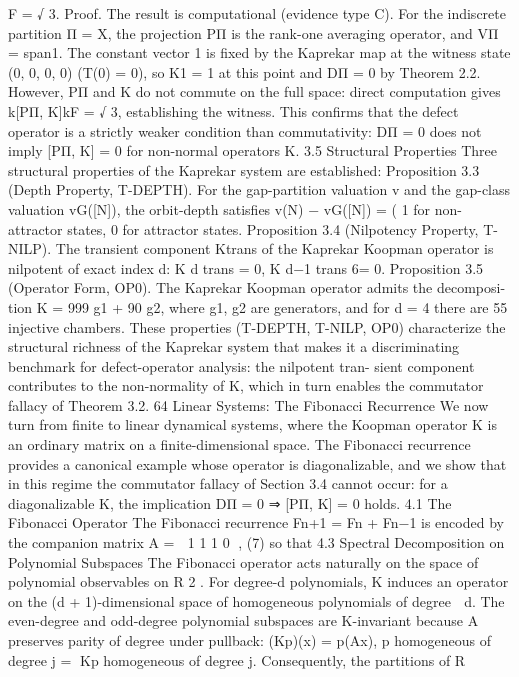 F
=
√
3.
Proof. The result is computational (evidence type C). For the indiscrete partition Π = {X}, the
projection PΠ is the rank-one averaging operator, and VΠ = span{1}. The constant vector 1 is
fixed by the Kaprekar map at the witness state (0, 0, 0, 0) (T(0) = 0), so K1 = 1 at this point and
DΠ = 0 by Theorem 2.2. However, PΠ and K do not commute on the full space: direct computation
gives k[PΠ, K]kF =
√
3, establishing the witness.
This confirms that the defect operator is a strictly weaker condition than commutativity: DΠ =
0 does not imply [PΠ, K] = 0 for non-normal operators K.
3.5 Structural Properties
Three structural properties of the Kaprekar system are established:
Proposition 3.3 (Depth Property, T-DEPTH). For the gap-partition valuation v and the gap-class
valuation vG([N]), the orbit-depth satisfies
v(N) − vG([N]) = (
1 for non-attractor states,
0 for attractor states.
Proposition 3.4 (Nilpotency Property, T-NILP). The transient component Ktrans of the Kaprekar
Koopman operator is nilpotent of exact index d:
K d
trans = 0, K d−1
trans 6= 0.
Proposition 3.5 (Operator Form, OP0). The Kaprekar Koopman operator admits the decomposi-
tion
K = 999 g1 + 90 g2,
where g1, g2 are generators, and for d = 4 there are 55 injective chambers.
These properties (T-DEPTH, T-NILP, OP0) characterize the structural richness of the Kaprekar
system that makes it a discriminating benchmark for defect-operator analysis: the nilpotent tran-
sient component contributes to the non-normality of K, which in turn enables the commutator
fallacy of Theorem 3.2.
64 Linear Systems: The Fibonacci Recurrence
We now turn from finite to linear dynamical systems, where the Koopman operator K is an ordinary
matrix on a finite-dimensional space. The Fibonacci recurrence provides a canonical example whose
operator is diagonalizable, and we show that in this regime the commutator fallacy of Section 3.4
cannot occur: for a diagonalizable K, the implication DΠ = 0 ⇒ [PΠ, K] = 0 holds.
4.1 The Fibonacci Operator
The Fibonacci recurrence Fn+1 = Fn + Fn−1 is encoded by the companion matrix
A =

1 1
1 0
, (7)
so that 4.3 Spectral Decomposition on Polynomial Subspaces
The Fibonacci operator acts naturally on the space of polynomial observables on R
2
. For degree-d
polynomials, K induces an operator on the (d + 1)-dimensional space of homogeneous polynomials
of degree ⩽ d. The even-degree and odd-degree polynomial subspaces are K-invariant because A
preserves parity of degree under pullback:
(Kp)(x) = p(Ax), p homogeneous of degree j =⇒ Kp homogeneous of degree j.
Consequently, the partitions of R
